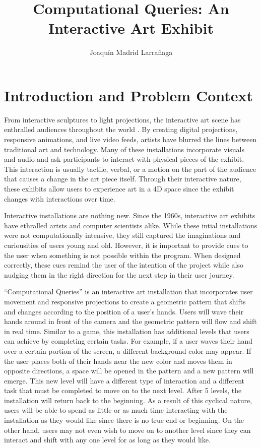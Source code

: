 \documentclass[10pt,twocolumn]{article}
\title{Computational Queries: An Interactive Art Exhibit}
\author{Joaquín Madrid Larrañaga}
\affiliation{Occidental College}
\begin{document}
\maketitle

\begin{abstract}
    
\end{abstract}

\section{Introduction and Problem Context}
From interactive sculptures to light projections, the interactive art scene has enthralled audiences throughout the world \cite{sarto_disneys_2021, noauthor_teamlab_2020}.  By creating digital projections, responsive animations, and live video feeds, artists have blurred the lines between traditional art and technology.  Many of these installations incorporate visuals and audio and ask participants to interact with physical pieces of the exhibit. This interaction is usually tactile, verbal, or a motion on the part of the audience that causes a change in the art piece itself.  Through their interactive nature, these exhibits allow users to experience art in a 4D space since the exhibit changes with interactions over time. 

Interactive installations are nothing new. Since the 1960s, interactive art exhibits have ethralled artsts and computer scientists alike\cite{trifonova_software_2008}.  While these intial installations were not computationally intensive, they still captured the imaginations and curiousities of users young and old.  However, it is important to provide cues to the user when something is not possible within the program.  When designed correctly, these cues remind the user of the intention of the project while also nudging them in the right direction for the next step in their user journey.  

``Computational Queries'' is an interactive art installation that incorporates user movement and responsive projections to create a geometric pattern that shifts and changes according to the position of a user's hands.  Users will wave their hands around in front of the camera and the geometric pattern will flow and shift in real time. Similar to a game, this installation has additional levels that users can achieve by completing certain tasks.  For example, if a user waves their hand over a certain portion of the screen, a different background color may appear.  If the user places both of their hands near the new color and moves them in opposite directions, a space will be opened in the pattern and a new pattern will emerge.  This new level will have a different type of interaction and a different task that must be completed to move on to the next level.  After 5 levels, the installation will return back to the beginning.  As a result of this cyclical nature, users will be able to spend as little or as much time interacting with the installation as they would like since there is no true end or beginning. On the other hand, users may not even wish to move on to another level since they can interact and shift with any one level for as long as they would like.  
\end{document}
